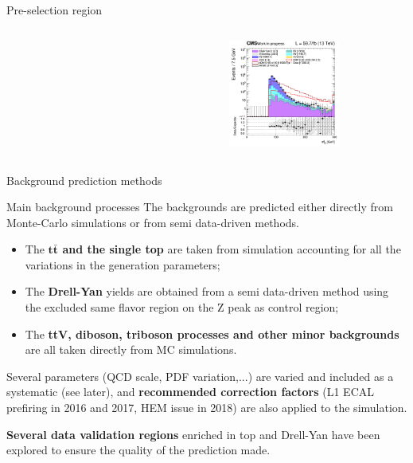 \documentclass[8pt]{beamer}
\begin{document}
\begin{frame}{Pre-selection region}
\begin{columns}
\begin{column}{0.33\textwidth}
\begin{center}
    		\end{center}		
		\end{column}
		\begin{column}{0.33\textwidth}
			\begin{center}
     			\includegraphics[width=1.0\textwidth, height=100pt]{figs/2018/SmearSR-ttDM-scalar100/log_cratio_topCR_ll_mt2ll.png}
    		\end{center}		
		\end{column}
\end{columns} \vfill
\end{frame}









\begin{frame}[standout]
Background prediction methods
\end{frame}

\begin{frame}{Main background processes}
\justifying
The backgrounds are predicted either directly from \alert{Monte-Carlo simulations or from semi data-driven methods}.

\begin{itemize}
\justifying
\item The \textbf{$\bm{t \bar t}$ and the single top} are taken from simulation accounting for all the variations in the generation parameters;
\item The \textbf{Drell-Yan} yields are obtained from a semi data-driven method using the excluded same flavor region on the Z peak as control region;
\item The \textbf{ttV, diboson, triboson processes and other minor backgrounds} are all taken directly from MC simulations.
\end{itemize} \vfill

Several parameters (QCD scale, PDF variation,...) are varied and included as a systematic (see later), and \textbf{recommended correction factors} (L1 ECAL prefiring in 2016 and 2017, HEM issue in 2018) are also applied to the simulation. \vfill 

\textbf{Several data validation regions} enriched in top and Drell-Yan have been explored to ensure the quality of the prediction made.\vfill
\end{frame}
\end{document}
